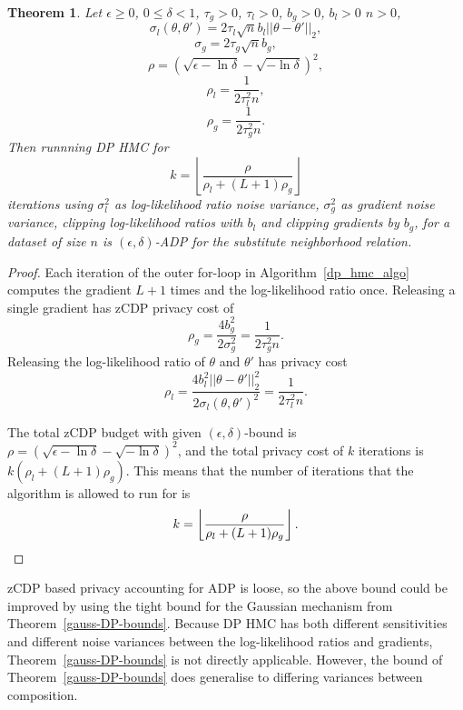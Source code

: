 \documentclass[english,twoside,openright]{HYgraduMLDS}
\newtheorem{theorem}[lemma]{Theorem}
\begin{document}
\begin{theorem}\label{dp_hmc_theorem_zcdp}
  Let \(\epsilon \geq 0\), \(0 \leq \delta < 1\), \(\tau_{g} > 0\), \(\tau_{l} > 0\),
  \(b_{g} > 0\), \(b_{l} > 0\) \(n > 0\),
  \[\sigma_l(\theta, \theta') = 2\tau_l\sqrt{n}b_l||\theta - \theta'||_2,\]
  \[\sigma_g = 2\tau_g\sqrt{n}b_g,\]
  \[
    \rho = \left(\sqrt{\epsilon - \ln \delta} - \sqrt{-\ln \delta}\right)^2,
  \]
  \[
    \rho_l = \frac{1}{2\tau_l^2n},
  \]
  \[
    \rho_g = \frac{1}{2\tau_g^2n}.
  \]
  Then runnning DP HMC for
  \[
    k = \left\lfloor\frac{\rho}{\rho_l + (L + 1)\rho_g}\right\rfloor
  \]
  iterations using \(\sigma_{l}^{2}\) as log-likelihood ratio noise variance,
  \(\sigma_{g}^{2}\) as gradient noise variance, clipping log-likelihood ratios
  with \(b_{l}\) and clipping gradients by \(b_{g}\), for a dataset of size \(n\)
  is \((\epsilon, \delta)\)-ADP for the substitute neighborhood relation.
\end{theorem}
\begin{proof}
  Each iteration of the outer for-loop in Algorithm~\ref{dp_hmc_algo}
  computes the gradient \(L + 1\) times and
  the log-likelihood ratio once. Releasing a single gradient has zCDP privacy
  cost of
  \[
    \rho_g = \frac{4b_g^2}{2\sigma_g^2} = \frac{1}{2\tau_g^2n}.
  \]
  Releasing the log-likelihood ratio of \(\theta\) and \(\theta'\) has privacy cost
  \[
    \rho_l = \frac{4b_l^2||\theta - \theta'||_2^2}{2\sigma_l(\theta, \theta')^2} = \frac{1}{2\tau_l^2n}.
  \]

  The total zCDP budget with given \((\epsilon, \delta)\)-bound is
  \(\rho = \left(\sqrt{\epsilon - \ln \delta} - \sqrt{-\ln \delta}\right)^2\),
  and the total privacy cost of \(k\) iterations is \(k(\rho_{l} + (L + 1)\rho_{g})\).
  This means that the number of iterations that the algorithm is allowed to run for
  is
  \[
    k = \left\lfloor\frac{\rho}{\rho_l + (L + 1)\rho_g}\right\rfloor.
    \qedhere
  \]
\end{proof}

zCDP based privacy accounting for ADP is loose, so the above bound could be improved
by using the tight bound for the Gaussian mechanism from
Theorem~\ref{gauss-DP-bounds}. Because DP HMC has both
different sensitivities and different noise variances between the log-likelihood
ratios and gradients, Theorem~\ref{gauss-DP-bounds} is not directly applicable.
However, the bound of Theorem~\ref{gauss-DP-bounds} does generalise to differing
variances between composition.
\end{document}
